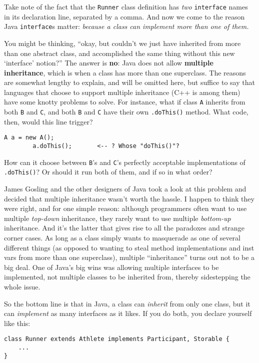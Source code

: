 Take note of the fact that the \texttt{Runner} class definition has
\textit{two} \texttt{interface} names in its declaration line, separated by a
comma. And now we come to the reason Java \texttt{interface}s matter:
\textit{because a class can implement more than one of them.}

You might be thinking, ``okay, but couldn't we just have inherited from more
than one abstract class, and accomplished the same thing without this new
`interface' notion?'' The answer is \textbf{no}: Java does not allow
\textbf{multiple inheritance}, which is when a class has more than one
superclass. The reasons are somewhat lengthy to explain, and will be omitted
here, but suffice to say that languages that choose to support multiple
inheritance (C++ is among them) have some knotty problems to solve. For
instance, what if class \texttt{A} inherits from both \texttt{B} and
\texttt{C}, and both \texttt{B} and \texttt{C} have their own
\texttt{.doThis()} method. What code, then, would this line trigger?

\begin{Verbatim}[fontsize=\small,samepage=true]
        A a = new A();
        a.doThis();       <-- ? Whose "doThis()"?
\end{Verbatim}

How can it choose between \texttt{B}'s and \texttt{C}'s perfectly acceptable
implementations of \texttt{.doThis()}? Or should it run both of them, and if
so in what order?

James Gosling and the other designers of Java took a look at this problem and
decided that multiple inheritance wasn't worth the hassle. I happen to think
they were right, and for one simple reason: although programmers often want to
use multiple \textit{top-down} inheritance, they rarely want to use multiple
\textit{bottom-up} inheritance. And it's the latter that gives rise to all the
paradoxes and strange corner cases. As long as a class simply wants to
masquerade as one of several different things (as opposed to wanting to steal
method implementations and inst vars from more than one superclass), multiple
``inheritance'' turns out not to be a big deal. One of Java's big wins was
allowing multiple interfaces to be implemented, not multiple classes to be
inherited from, thereby sidestepping the whole issue.

\begin{samepage}
So the bottom line is that in Java, a class can \textit{inherit} from only one
class, but it can \textit{implement} as many interfaces as it likes. If you do
both, you declare yourself like this:

\begin{Verbatim}[fontsize=\small,samepage=true,frame=single]
class Runner extends Athlete implements Participant, Storable {
    ...
}
\end{Verbatim}
\end{samepage}

